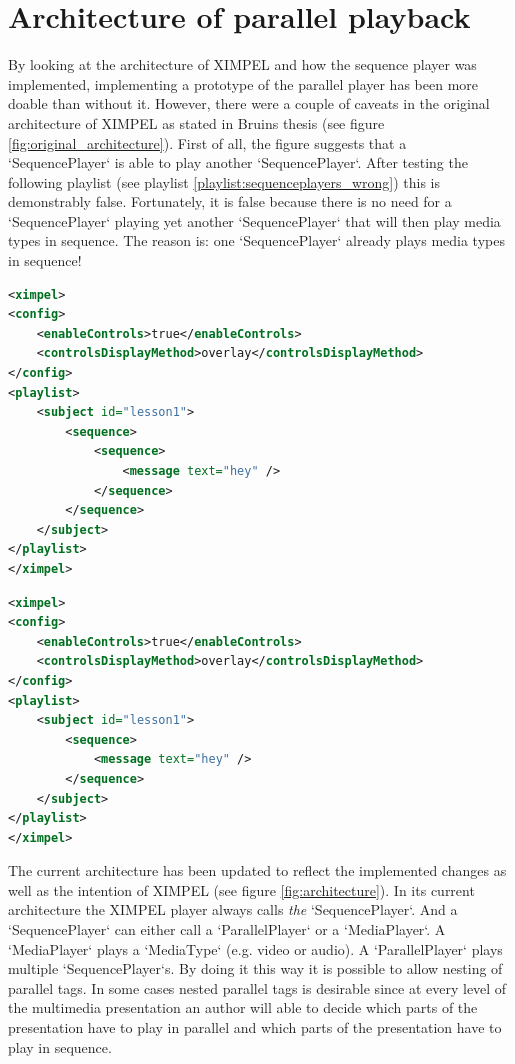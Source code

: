 \section{Architecture of parallel playback}

By looking at the architecture of XIMPEL and how the sequence player was implemented, implementing a prototype of the parallel player has been more doable than without it. However, there were a couple of caveats in the original architecture of XIMPEL as stated in Bruins thesis (see figure \ref{fig:original_architecture}). First of all, the figure suggests that a `SequencePlayer` is able to play another `SequencePlayer`. After testing the following playlist (see playlist \ref{playlist:sequenceplayers_wrong}) this is demonstrably false. Fortunately, it is false because there is no need for a `SequencePlayer` playing yet another `SequencePlayer` that will then play media types in sequence. The reason is: one `SequencePlayer` already plays media types in sequence!

\begin{lstlisting}[language=XML, caption=This playlist contains a nested sequence tag and therefore does not work. This demonstrates that the architecture in figure \ref{fig:original_architecture} as outlined in Stefan Bruins\cite{stefan2016} his thesis (fortunately) does not work as prescribed., label=playlist:sequenceplayers_wrong]
<ximpel>
<config>
    <enableControls>true</enableControls>
    <controlsDisplayMethod>overlay</controlsDisplayMethod>
</config>
<playlist>
    <subject id="lesson1">
        <sequence>
            <sequence>
                <message text="hey" />
            </sequence>
        </sequence>
    </subject>
</playlist>
</ximpel>
\end{lstlisting}

\begin{lstlisting}[language=XML, caption=this playlist does work and serves as a counter example to playlist \ref{playlist:sequenceplayers_wrong} which has a nested sequence tag., label=playlist:sequenceplayers_right]
<ximpel> 
<config>
    <enableControls>true</enableControls>
    <controlsDisplayMethod>overlay</controlsDisplayMethod>
</config>
<playlist>
    <subject id="lesson1">
        <sequence>
            <message text="hey" />
        </sequence>
    </subject>
</playlist>
</ximpel>
\end{lstlisting}

The current architecture has been updated to reflect the implemented changes as well as the intention of XIMPEL (see figure \ref{fig:architecture}). In its current architecture the XIMPEL player always calls \textit{the} `SequencePlayer`. And a `SequencePlayer` can either call a `ParallelPlayer` or a `MediaPlayer`. A `MediaPlayer` plays a `MediaType` (e.g. video or audio). A `ParallelPlayer` plays multiple `SequencePlayer`s. By doing it this way it is possible to allow nesting of parallel tags. In some cases nested parallel tags is desirable since at every level of the multimedia presentation an author will able to decide which parts of the presentation have to play in parallel and which parts of the presentation have to play in sequence.

